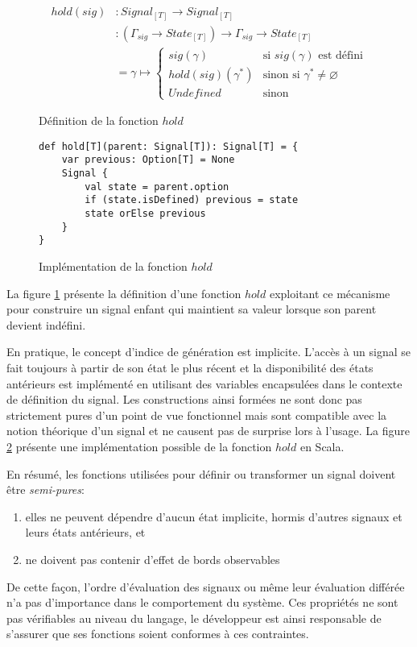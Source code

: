 	\begin{figure}
		\begin{align*}
			hold (sig) &\colon Signal_{[T]} \to Signal_{[T]} \\
			           &\colon (\Gamma_{sig} \to State_{[T]}) \to \Gamma_{sig} \to State_{[T]} \\
			           &= \gamma \mapsto \begin{cases}
			           		sig(\gamma) & \text{si } sig(\gamma) \text{ est défini} \\
			           		hold(sig)(\gamma^*) & \text{sinon si } \gamma^* \ne \varnothing \\
			           		Undefined & \text{sinon}
			           \end{cases}
		\end{align*}
		\caption{Définition de la fonction $hold$}
		\label{fig:sig-hold}
	\end{figure}

	\begin{figure}
		\begin{lstlisting}
def hold[T](parent: Signal[T]): Signal[T] = {
	var previous: Option[T] = None
	Signal {
		val state = parent.option
		if (state.isDefined) previous = state
		state orElse previous
	}
}
		\end{lstlisting}
		\caption{Implémentation de la fonction $hold$}
		\label{fig:sig-hold-scala}
	\end{figure}

	La figure \ref{fig:sig-hold} présente la définition d'une fonction $hold$ exploitant ce mécanisme pour construire un signal enfant qui maintient sa valeur lorsque son parent devient indéfini.
	
	En pratique, le concept d'indice de génération est implicite. L'accès à un signal se fait toujours à partir de son état le plus récent et la disponibilité des états antérieurs est implémenté en utilisant des variables encapsulées dans le contexte de définition du signal. Les constructions ainsi formées ne sont donc pas strictement pures d'un point de vue fonctionnel mais sont compatible avec la notion théorique d'un signal et ne causent pas de surprise lors à l'usage. La figure \ref{fig:sig-hold-scala} présente une implémentation possible de la fonction $hold$ en Scala.
	
	En résumé, les fonctions utilisées pour définir ou transformer un signal doivent être \emph{semi-pures}:
	\begin{enumerate}
		\item elles ne peuvent dépendre d'aucun état implicite, hormis d'autres signaux et leurs états antérieurs, et
		\item ne doivent pas contenir d'effet de bords observables
	\end{enumerate}
	De cette façon, l'ordre d'évaluation des signaux ou même leur évaluation différée n'a pas d'importance dans le comportement du système. Ces propriétés ne sont pas vérifiables au niveau du langage, le développeur est ainsi responsable de s'assurer que ses fonctions soient conformes à ces contraintes.
	
